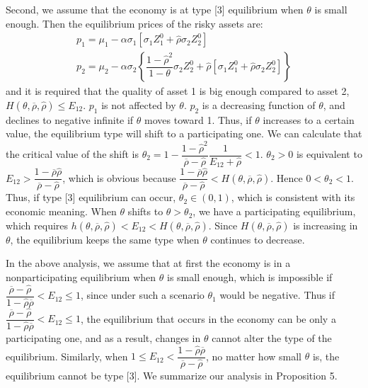 \documentclass[10pt]{article}
\begin{document}
Second, we assume that the economy is at type [3] equilibrium when $ \theta $ is small enough. Then the equilibrium prices of the risky assets are:
\begin{eqnarray*}
& p_1 = \mu_1 - \alpha \sigma_1 \left[ \sigma_1 Z_1^0 + {\hat \rho} \sigma_2 Z_2^0 \right] & \\
& p_2 = \mu_2 - \alpha \sigma_2 \left\{ \dfrac{1 - {\hat \rho}^2}{1 - \theta} \sigma_2 Z_2^0 + {\hat \rho} \left[ \sigma_1 Z_1^0 + {\hat \rho} \sigma_2 Z_2^0 \right] \right\} &
\end{eqnarray*}
and it is required that the quality of asset 1 is big enough compared to asset 2, $ H (\theta, \overline{\rho}, {\hat \rho}) \leqslant E_{1 2} $. $ p_1 $ is not affected by $ \theta $. $ p_2 $ is a decreasing function of $ \theta $, and declines to negative infinite if $ \theta $ moves toward 1. Thus, if $ \theta $ increases to a certain value, the equilibrium type will shift to a participating one. We can calculate that the critical value of the shift is $ \theta_2 = 1 - \dfrac{1 - {\hat \rho}^2}{\overline{\rho} - {\hat \rho}} \dfrac{1}{E_{1 2} + {\hat \rho}} < 1 $. $ \theta_2 > 0 $ is equivalent to $ E_{1 2} > \dfrac{1 - \overline{\rho} {\hat \rho}}{\overline{\rho} - {\hat \rho}} $, which is obvious because $ \dfrac{1 - \overline{\rho} {\hat \rho}}{\overline{\rho} - {\hat \rho}} < H (\theta, \overline{\rho}, {\hat \rho}) $. Hence $ 0 < \theta_2 < 1 $. Thus, if type [3] equilibrium can occur, $ \theta_2 \in (0, 1) $, which is consistent with its economic meaning. When $ \theta $ shifts to $ \theta > \theta_2 $, we have a participating equilibrium, which requires $ h (\theta, \overline{\rho}, {\hat \rho}) < E_{1 2} < H (\theta, \overline{\rho}, {\hat \rho}) $. Since $ H (\theta, \overline{\rho}, {\hat \rho}) $ is increasing in $ \theta $, the equilibrium keeps the same type when $ \theta $ continues to decrease.

In the above analysis, we assume that at first the economy is in a nonparticipating equilibrium when $ \theta $ is small enough, which is impossible if $ \dfrac{\overline{\rho} - {\hat \rho}}{1 - {\hat \rho} \overline{\rho}} < E_{1 2} \leqslant 1 $, since under such a scenario $\theta_{1}$ would be negative. Thus if $ \dfrac{\overline{\rho} - {\hat \rho}}{1 - {\hat \rho} \overline{\rho}} < E_{1 2} \leqslant 1 $, the equilibrium that occurs in the economy can be only a participating one, and as a result, changes in $ \theta $ cannot alter the type of the equilibrium. Similarly, when $ 1 \leqslant E_{1 2} < \dfrac{1 - {\hat \rho} \overline{\rho}}{\overline{\rho} - {\hat \rho}} $, no matter how small $ \theta $ is, the equilibrium cannot be type [3]. We summarize our analysis in Proposition 5. 
\end{document}
